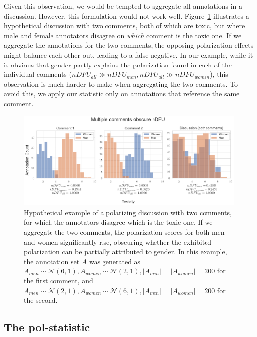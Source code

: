 \documentclass{article}
\begin{document}
Given this observation, we would be tempted to aggregate all annotations in a discussion. However, this formulation would not work well.  Figure~\ref{fig:ndfu_multi_comment} illustrates a hypothetical discussion with two comments, both of which are toxic, but where male and female annotators disagree on \emph{which} comment is the toxic one. If we aggregate the annotations for the two comments, the opposing polarization effects might balance each other out, leading to a false negative. In our example, while it is obvious that gender partly explains the polarization found in each of the individual comments ($nDFU_{all} \gg nDFU_{men}, nDFU_{all} \gg nDFU_{women}$), this observation is much harder to make when aggregating the two comments. To avoid this, we apply our statistic only on annotations that reference the same comment. 

\begin{figure}
	\centering
	\includegraphics[width=\linewidth]{ndfu_multi_comments.png}
	\caption{Hypothetical example of a polarizing discussion with two comments, for which the annotators disagree which is the toxic one. If we aggregate the two comments, the polarization scores for both men and women significantly rise, obscuring whether the exhibited polarization can be partially attributed to gender. In this example, the annotation set $A$ was generated as $A_{men} \sim \mathcal{N}(6, 1), A_{women} \sim \mathcal{N}(2, 1), \lvert A_{men} \rvert = \lvert A_{women} \rvert = 200$ for the first comment, and $A_{men} \sim \mathcal{N}(2, 1), A_{women} \sim \mathcal{N}(6, 1), \lvert A_{men} \rvert = \lvert A_{women} \rvert = 200$ for the second.}
	\label{fig:ndfu_multi_comment}
\end{figure}

 
 
 \subsection{The pol-statistic}
 \label{ssec:methodology:polstat}
  
\end{document}
